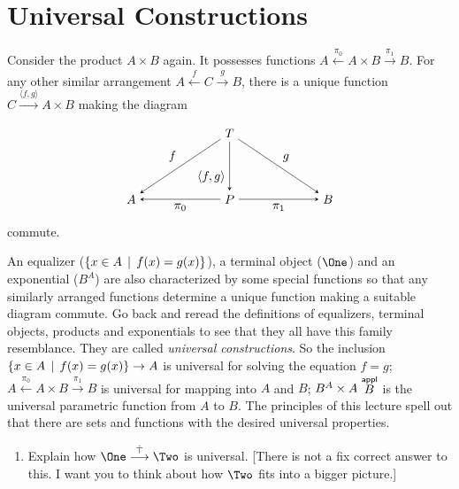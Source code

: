 \section{Universal Constructions}

Consider the product $A\times B$ again.
It possesses functions 
$A\stackrel{\pi_0}{\longleftarrow}A\times B\stackrel{\pi_1}{\longrightarrow}B$. For any other similar arrangement
$A\stackrel{f}{\longleftarrow}C\stackrel{g}{\longrightarrow}B$, there is a unique function $C\stackrel{\langle f,g\rangle}{\longrightarrow}{A\times B}$ making the diagram
\[
\tikzset{>=stealth}
\begin{tikzpicture}[every node/.style={midway}]
\matrix[column sep={4em,between origins},row sep={2em}] at (0,0)
{ 					&	& \node(T) {$T$}; &	& \\
	\\
	\node(A)   {$A$}; &	& \node(P) {$P$}; &	& \node(B) {$B$}; \\};
\draw[->] (T) -- (A) node[anchor=south east]  {$f$};
\draw[->] (T) -- (B) node[anchor=south west]  {$g$};
\draw[->] (T) -- (P) node[anchor=north east] {$\langle f,g \rangle$};
\draw[->] (P) -- (A) node[anchor=north] {$\pi_0$};
\draw[->] (P) -- (B) node[anchor=north] {$\pi_1$};
\end{tikzpicture}
\]
commute.

An equalizer ($\{x\in A\,\mid\, f(x)=g(x)\}$), a terminal object ($\One$) and an exponential ($B^A$) are also characterized by some special functions so that any similarly arranged functions determine a unique function making a suitable diagram commute.
Go back and reread the definitions of equalizers, terminal objects, products and exponentials to see that they all have this family resemblance.
They are called \emph{universal constructions}.
So the inclusion $\{x\in A\,\mid\, f(x)=g(x)\}\to A$ is universal for solving the equation $f=g$; $A\stackrel{\pi_0}{\longleftarrow}A\times B\stackrel{\pi_1}{\longrightarrow}B$ is universal for mapping into $A$ and $B$;
$B^A\times A\stackrel{\mathord{\textsf{appl}}}B$ is the universal parametric function from $A$ to $B$.
The principles of this lecture spell out that there are sets and functions 
with the desired universal properties.

\begin{exercises}
	\begin{enumerate}
		\item Explain how $\One\stackrel{\hat{\top}}{\longrightarrow}\Two$ is universal. [There is not a fix correct answer to this. 
		I want you to think about how $\Two$ fits into a bigger picture.]
	\end{enumerate}
\end{exercises}

